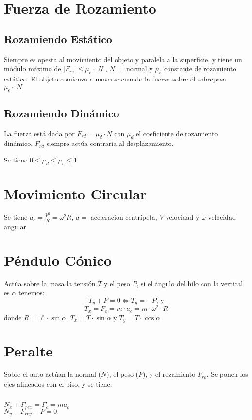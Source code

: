 \documentclass[a4paper]{article}
\begin{document}
\section{Fuerza de Rozamiento}
\subsection{Rozamiendo Estático}
Siempre es opesta al movimiento del objeto y paralela a la superficie,
y tiene un módulo máximo de \(
|F_{re}| \le \mu_e \cdot |N|
\), $N =$ normal y $\mu_e$ constante de rozamiento estático. El objeto
comienza a moverse cuando la fuerza sobre él sobrepasa \(\mu_e \cdot |N| \)
\subsection{Rozamiendo Dinámico}
La fuerza está dada por \(
F_{rd} = \mu_d \cdot N
\) con $\mu_d$ el coeficiente de rozamiento dinámico. $F_{rd}$ siempre actúa
contraria al desplazamiento.

Se tiene \(
	0 \le \mu_d \le \mu_e \le 1
\)
\section{Movimiento Circular}
Se tiene \(
a_c = \frac{V^2}{R} = \omega^2R
\), $a =$ aceleración centrípeta, $V$ velocidad y $\omega$ velocidad angular
\section{Péndulo Cónico}
Actúa sobre la masa la tensión $T$ y el peso $P$, si el ángulo del hilo con
la vertical es $\alpha$ tenemos:
\[
	T_y + P = 0 \iff T_y = -P \text{, y}
\]
\[
	T_x = F_c = m \cdot a_c = m \cdot \omega^2 \cdot R
\]
donde $R$ = $\ell \cdot \sin \alpha$, $T_x = T \cdot \sin \alpha$ y $T_y
= T \cdot \cos \alpha$
\section{Peralte}
Sobre el auto actúan la normal ($N$), el peso ($P$),
y el rozamiento $F_{re}$.
Se ponen los ejes alineados con el piso, y se tiene:

\begin{multicols}{3}
	$\quad$
	\columnbreak

\columnbreak

\[\quad\]
\(
	N_x + F_{rex}  = F_c = ma_c
\)
\[\quad\]
\(
	N_y - F_{rey} - P = 0
\)
\end{multicols}
\end{document}
